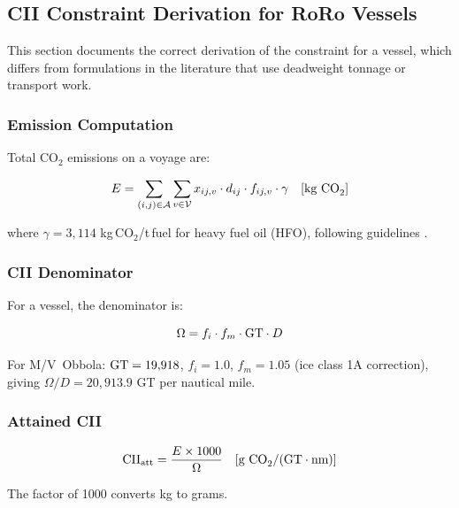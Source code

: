 \subsection{CII Constraint Derivation for RoRo Vessels}
\label{sec:model:cii}

This section documents the correct derivation of the \CII{} constraint
for a \RoRo{} vessel, which differs from formulations in the literature
that use deadweight tonnage or transport work.

\subsubsection{Emission Computation}

Total CO$_2$ emissions on a voyage are:

\begin{equation}
  E = \sum_{(i,j)\in\mathcal{A}} \sum_{v\in\mathcal{V}}
        x_{ij,v} \cdot d_{ij} \cdot f_{ij,v} \cdot \gamma
  \quad [\text{kg CO}_2]
  \label{eq:total_co2}
\end{equation}

\noindent where $\gamma = 3{,}114$ kg\,CO$_2$/t\,fuel for heavy fuel
oil (HFO), following \IMO{} guidelines \parencite{mepc336}.

\subsubsection{CII Denominator}

For a \RoRo{} vessel, the \CII{} denominator is:

\begin{equation}
  \Omega = f_i \cdot f_m \cdot \mathrm{GT} \cdot D
  \label{eq:cii_denom}
\end{equation}

\noindent For M/V~Obbola: $\mathrm{GT} = 19{,}918$, $f_i = 1.0$,
$f_m = 1.05$ (ice class 1A correction), giving
$\Omega / D = 20{,}913.9$ GT per nautical mile.

\subsubsection{Attained CII}

\begin{equation}
  \mathrm{CII}_{\mathrm{att}} = \frac{E \times 1000}{\Omega}
  \quad [\text{g CO}_2 / (\mathrm{GT} \cdot \text{nm})]
  \label{eq:cii_attained}
\end{equation}

\noindent The factor of 1000 converts kg to grams.

